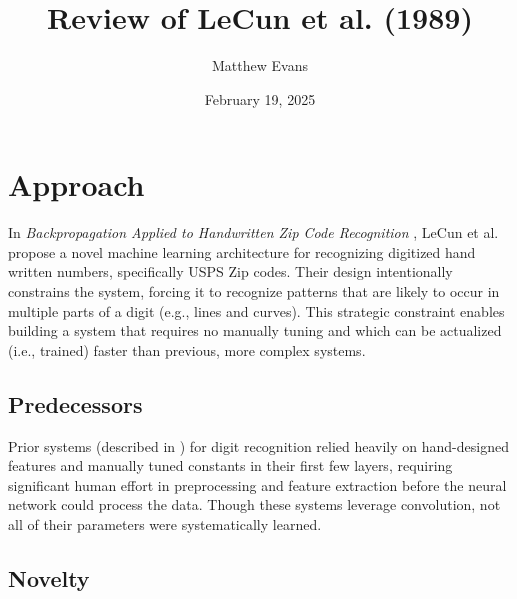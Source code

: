 \documentclass[10pt]{article}
\title{
    Review of LeCun et al. (1989) \\
}
\author{Matthew Evans}
\date{February 19, 2025}
\begin{document}
\maketitle

\section*{Approach}
In \textit{Backpropagation Applied to Handwritten Zip Code Recognition} \cite{lecun1998gradient}, LeCun et al. propose a novel machine learning architecture for recognizing digitized hand written numbers, specifically USPS Zip codes. Their design intentionally constrains the system, forcing it to recognize patterns that are likely to occur in multiple parts of a digit (e.g., lines and curves). This strategic constraint enables building a system that requires no manually tuning and which can be actualized (i.e., trained) faster than previous, more complex systems.

\subsection*{Predecessors}

Prior systems (described in \cite{Denker1989}) for digit recognition relied heavily on hand-designed features and manually tuned constants in their first few layers, requiring significant human effort in preprocessing and feature extraction before the neural network could process the data. Though these systems leverage convolution, not all of their parameters were systematically learned.





\subsection*{Novelty}
\end{document}
